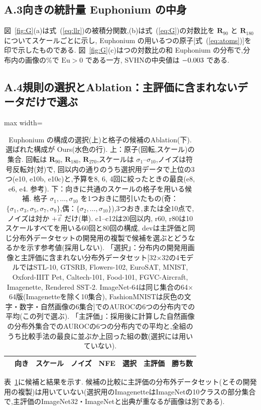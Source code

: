 \documentclass[MIRU,submit,onecolumn]{miru2025j}
\newcommand{\veps}{\vec{\varepsilon}}
\newcommand{\Rot}[1]{\mathbf{R}_{#1}}
\newcommand{\Eu}{\mathrm{Eu}}        %
\renewcommand{\eqref}[1]{(\ref{#1})}   %
\begin{document}
\subsection*{A.3\quad 向きの統計量 Euphonium の中身}
図~\ref{fig:G}(a)は式~\eqref{eq:llr}の被積分関数,(b)は式~\eqref{eq:G}の対数比を $\Rot{90}$ と $\Rot{180}$ についてスケールごとに示し, Euphonium の用いるつの原子[式~\eqref{eq:atoms}]を印で示したものである.%
図~\ref{fig:G}(c)はつの対数比の和 Euphonium の分布で,分布内の画像の\GposID\%で $\Eu>0$ である一方, SVHNの中央値は $-0.003$ である.

\subsection*{A.4\quad 規則の選択とAblation：主評価に含まれないデータだけで選ぶ}
\label{sec:variants}
\begin{table}[h]\centering\footnotesize
\caption{Euphonium の構成の選択(上)と格子の候補のAblation(下). 選ばれた構成が Ours(水色の行). 上：原子(回転,スケール)の集合. 回転は $\Rot{90}$, $\Rot{180}$, $\Rot{270}$,スケールは $\sigma_1$--$\sigma_{10}$,ノイズは符号反転対(対)で, \nfeG{}回以内の\nCandTwo{}通りのうち選択用データで上位の3つ(e10, e10b, e10c)と,予算を8, 6, 4回に絞ったときの最良(e8, e6, e4. 参考). 下：向きに共通のスケールの格子を用いる候補. 格子 $\sigma_1,\dots,\sigma_{10}$ を1つおきに間引いたもの(奇：$\{\sigma_1,\sigma_3,\sigma_5,\sigma_7,\sigma_9\}$,偶：$\{\sigma_2,\dots,\sigma_{10}\}$),3つおき,または全10点で,ノイズは対か $+\veps$ だけ(単). c1--c12は20回以内, r60, r80は10スケールすべてを用いる60回と80回の構成, devは主評価と同じ分布外データセットの開発用の複製で候補を選ぶとどうなるかを示す参考値(採用しない). 「選択」：分布内の開発用画像と主評価に含まれない分布外データセット[32$\times$32の4モデルではSTL-10, GTSRB, Flowers-102, EuroSAT, MNIST, Oxford-IIIT Pet, Caltech-101, Food-101, FGVC-Aircraft, Imagenette, Rendered SST-2. ImageNet-64は同じ集合の64$\times$64版(Imagenetteを除く10集合), FashionMNISTは灰色の文字・数字・自然画像の6集合]でのAUROCの6つの分布内での平均(この列で選ぶ). 「主評価」：採用後に計算した自然画像の分布外集合でのAUROCの6つの分布内での平均と,全\nPairs{}組のうち比較手法の最良に並ぶか上回った組の数(選択には用いていない).}
\label{tab:variants}
\begin{adjustbox}{max width=\columnwidth}
\setlength{\tabcolsep}{3pt}\begin{tabular}{@{}lllcrccc@{}}\toprule
 & 向き & スケール & ノイズ & NFE & 選択 & 主評価 & 勝ち数\\\midrule

\end{tabular}
\end{adjustbox}
\end{table}
表~\ref{tab:variants}に候補と結果を示す.%
候補の比較に主評価の分布外データセット(とその開発用の複製)は用いていない(選択用のImagenetteはImageNetの10クラスの部分集合で,主評価のImageNet32・ImageNetと出典が重なるが画像は別である).%
\end{document}
